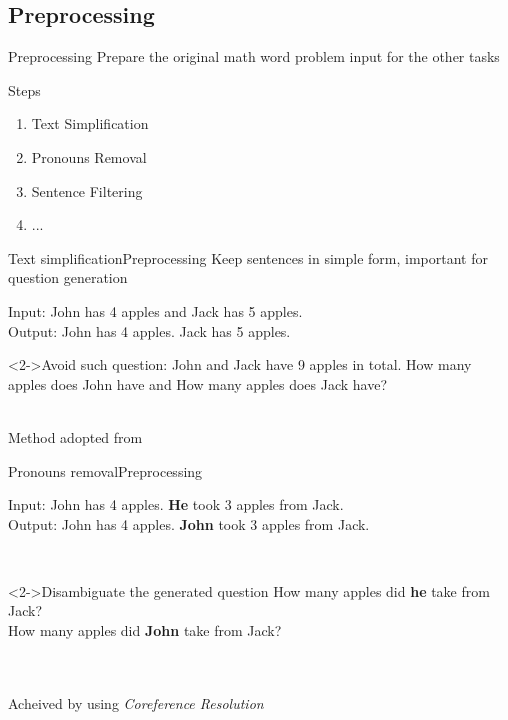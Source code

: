 \documentclass[11pt]{beamer}
\begin{document}
\subsection{Preprocessing}
\begin{frame}{Preprocessing}
    Prepare the original math word problem input for the other tasks\\
    \begin{block}{Steps}
    \begin{enumerate}
        \item Text Simplification
        \item Pronouns Removal
        \item Sentence Filtering
        \item ...
    \end{enumerate}
    \end{block}
\end{frame}

\begin{frame}{Text simplification}{Preprocessing}
    Keep sentences in simple form, important for question generation
    \begin{example}
    Input: John has 4 apples and Jack has 5 apples.\\
    Output: John has 4 apples. Jack has 5 apples.
    \end{example}
    \begin{block}<2->{Avoid such question:}
     John and Jack have 9 apples in total. How many apples does John have and How many apples does Jack have?
    \end{block}
    ~\\
    Method adopted from \emph{\cite{Heilman2010}}
\end{frame}

\begin{frame}{Pronouns removal}{Preprocessing}
    \begin{example}
    Input: John has 4 apples. \textbf{He} took 3 apples from Jack. \\
    Output: John has 4 apples. \textbf{John} took 3 apples from Jack.
    \end{example}
    ~\\
    \begin{block}<2->{Disambiguate the generated question}
     How many apples did \textbf{he} take from Jack?\\
     How many apples did \textbf{John} take from Jack?
    \end{block}  
    ~\\~\\
    Acheived by using \emph{Coreference Resolution} 
\end{frame}
\end{document}

